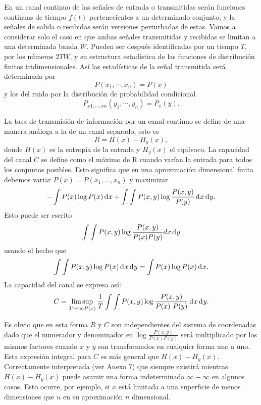	En un canal continuo de las se\~nales de entrada o
	transmitidas ser\'an funciones continuas de tiempo $f(t)$
	pertenecientes a un determinado conjunto, y la señales de
	salida o recibidas ser\'an versiones perturbadas de
	estas. Vamos a considerar solo el caso en que ambas se\~nales
	transmitidas y recibidas se limitan a una determinada banda
	$W$. Pueden ser despu\'es identificadas por un tiempo $T$, por
	los n\'umeros $2TW$, y su estructura estad\'istica de las
	funciones de distribuci\'on finitos tridimensionales. As\'i
	las estad\'isticas de la se\~nal transmitida ser\'a
	determinada por
	\begin{equation}
		P(x_{1}, \cdots ,x_{n}) = P(x)
	\end{equation}	 
	y los del ruido por la distribuci\'on de probabilidad condicional
	\begin{equation}
		P_{x1, \cdots ,xn} (y_{1}, \cdots ,y_{n}) = P_{x}(y).
	\end{equation}
	
La tasa de transmisi\'on de informaci\'on por un canal continuo se
define de una manera an\'aloga a la de un canal separado, esto
es 
\begin{equation} 
R = H(x) - H_{y}(x), 
\end{equation} 
donde $H(x)$ es la entrop\'ia de la entrada y $H_{y}(x)$ el
equ\'ivoco. La capacidad del canal $C$ se define como el m\'aximo de R
cuando var\'ian la entrada para todos los conjuntos posibles. Esto
significa que en una aproximaci\'on dimensional finita debemos variar
$P(x) = P(x_{1},...,x_{n})$ y maximizar 
\begin{equation} 
- \int P(x) \log P(x) \diff x 
+ \int\int P(x,y)\log \frac{P(x,y)}{P(y)} \diff x \diff y.  
\end{equation} 
Esto puede ser escrito 
\begin{equation} 
\int\int P(x,y) \log \frac{P(x,y)}{P(x)P(y)}dx \diff y
\end{equation} 
usando el hecho que
\begin{equation}
\int\int P(x,y)\log P(x) \diff x \diff y = 
\int P(x)\log P(x) \diff x.
\end{equation} 
La capacidad del canal se expresa as\'i:
\begin{equation}
C = \limsup_{T\to \infty P(x)} 
\frac{1}{T}
\int\int P(x,y)\log \frac{P(x,y)}{P(x)~P(y)} \diff x \diff y.
\end{equation}
	
Es obvio que en esta forma $R$ y $C$ son independientes del sistema de
coordenadas dado que el numerador y denominador en
$\log\frac{P(x,y)}{P(x)P(y)}$ ser\'a multiplicado por los mismos
factores cuando $x$ y $y$ son transformados en cualquier forma uno a
uno. Esta expresi\'on integral para $C$ es m\'{a}s general que
$H(x) - H_{y}(x)$. Correctamente interpretada (ver Anexo 7) que siempre
existir\'a mientras $H(x)-H_{y}(x)$ puede asumir una forma
indeterminada $\infty - \infty$ en algunos casos. Esto ocurre, por
ejemplo, si $x$ est\'a limitada a una superficie de menos dimensiones
que $n$ en su aproximaci\'on $n$ dimensional.
	
